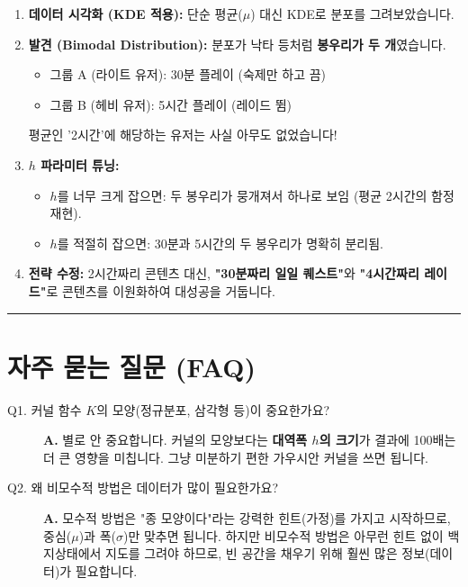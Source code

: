 \documentclass[11pt,a4paper]{book}
\theoremstyle{definition}
\begin{document}
\begin{enumerate}
    \item \textbf{데이터 시각화 (KDE 적용):}
    단순 평균($\mu$) 대신 KDE로 분포를 그려보았습니다.
    
    \item \textbf{발견 (Bimodal Distribution):}
    분포가 낙타 등처럼 \textbf{봉우리가 두 개}였습니다.
    \begin{itemize}
        \item 그룹 A (라이트 유저): 30분 플레이 (숙제만 하고 끔)
        \item 그룹 B (헤비 유저): 5시간 플레이 (레이드 뜀)
    \end{itemize}
    평균인 '2시간'에 해당하는 유저는 사실 아무도 없었습니다!
    
    \item \textbf{$h$ 파라미터 튜닝:}
    \begin{itemize}
        \item $h$를 너무 크게 잡으면: 두 봉우리가 뭉개져서 하나로 보임 (평균 2시간의 함정 재현).
        \item $h$를 적절히 잡으면: 30분과 5시간의 두 봉우리가 명확히 분리됨.
    \end{itemize}
    
    \item \textbf{전략 수정:}
    2시간짜리 콘텐츠 대신, \textbf{"30분짜리 일일 퀘스트"}와 \textbf{"4시간짜리 레이드"}로 콘텐츠를 이원화하여 대성공을 거둡니다.
\end{enumerate}

\vspace{0.5cm}\hrule\vspace{0.5cm}

\section{자주 묻는 질문 (FAQ)}

\begin{description}
    \item[Q1. 커널 함수 $K$의 모양(정규분포, 삼각형 등)이 중요한가요?]
    \textbf{A.} 별로 안 중요합니다. 커널의 모양보다는 \textbf{대역폭 $h$의 크기}가 결과에 100배는 더 큰 영향을 미칩니다. 그냥 미분하기 편한 가우시안 커널을 쓰면 됩니다.
    
    \item[Q2. 왜 비모수적 방법은 데이터가 많이 필요한가요?]
    \textbf{A.} 모수적 방법은 "종 모양이다"라는 강력한 힌트(가정)를 가지고 시작하므로, 중심($\mu$)과 폭($\sigma$)만 맞추면 됩니다. 하지만 비모수적 방법은 아무런 힌트 없이 백지상태에서 지도를 그려야 하므로, 빈 공간을 채우기 위해 훨씬 많은 정보(데이터)가 필요합니다.
\end{description}
\end{document}
